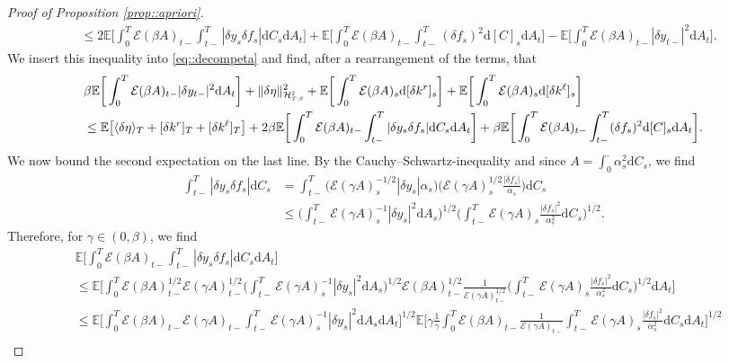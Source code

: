 \documentclass[10pt]{article} %
\newcommand\cE{\mathcal E}
\newcommand\cH{\mathcal H}
\newcommand{\smalltext}[1]{\text{\fontsize{4}{4}\selectfont$#1$}}
\def \E{\mathbb{E}}
\newcommand{\1}{\mathbf{1}}
\def\d{\mathrm{d}}
\begin{document}
\begin{proof}[Proof of Proposition \ref{prop::apriori}]
\begin{align*}
	&\leq 2 \E\bigg[ \int_0^T \cE(\beta A)_{t-} \int_{t-}^T |\delta y_s \delta f_s| \d C_s\d A_t \bigg] + \E\bigg[ \int_0^T \cE(\beta A)_{t-} \int_{t-}^T (\delta f_s)^2 \d [C]_s \d A_t \bigg]  - \E\bigg[ \int_0^T \cE(\beta A)_{t-}|\delta y_{t-}|^2 \d A_t \bigg].
\end{align*}
We insert this inequality into \eqref{eq::decompeta} and find, after a rearrangement of the terms, that
\begin{align}\label{eq::inequality_norms_1}
	&\beta \E\bigg[ \int_0^T \cE(\beta A)_{t-}|\delta y_{t-}|^2 \d A_t \bigg] + \|\delta\eta\|^2_{\cH^\smalltext{2}_{\smalltext{T}\smalltext{,}\smalltext{\beta}}} + \E\bigg[\int_0^T \cE(\beta A)_s \d [\delta k^r]_s\bigg] + \E\bigg[\int_0^T \cE(\beta A)_s \d [\delta k^\ell]_s\bigg] \nonumber\\
	&\leq \E\big[ \langle \delta\eta \rangle_T + [\delta k^r]_T + [\delta k^\ell]_T \big] + 2\beta \E\bigg[ \int_0^T \cE(\beta A)_{t-} \int_{t-}^T |\delta y_s \delta f_s| \d C_s\d A_t \bigg] + \beta \E\bigg[ \int_0^T \cE(\beta A)_{t-} \int_{t-}^T (\delta f_s)^2 \d [C]_s \d A_t \bigg].
\end{align}
We now bound the second expectation on the last line. By the Cauchy--Schwartz-inequality and since $A = \int_0^\cdot \alpha^2_s \d C_s$, we find
\begin{align*}
	\int_{t-}^T |\delta y_s \delta f_s|\d C_s 
	&= \int_{t-}^T \big(\cE(\gamma A)^{-1/2}_s|\delta y_s|\alpha_s\big) \bigg(\cE(\gamma A)^{1/2}_s\frac{|\delta f_s|}{\alpha_s}\bigg)\d C_s \\
	&\leq \bigg(\int_{t-}^T \cE(\gamma A)^{-1}_s |\delta y_s|^2 \d A_s\bigg)^{1/2}\bigg(\int_{t-}^T \cE(\gamma A)_s\frac{|\delta f_s|^2}{\alpha^2_s}\d C_s\bigg)^{1/2}.
\end{align*}
Therefore, for $\gamma \in (0,\beta)$, we find
\begin{align}\label{eq6}
	&\E\bigg[ \int_0^T \cE(\beta A)_{t-}\int_{t-}^T |\delta y_s \delta f_s|\d C_s \d A_t \bigg] \nonumber \\
	&\leq \E\bigg[ \int_0^T \cE(\beta A)^{1/2}_{t-}\cE(\gamma A)^{1/2}_{t-}\bigg(\int_{t-}^T \cE(\gamma A)^{-1}_s |\delta y_s|^2 \d A_s\bigg)^{1/2} \cE(\beta A)^{1/2}_{t-}\frac{1}{\cE(\gamma A)^{1/2}_{t-}}\bigg(\int_{t-}^T \cE(\gamma A)_s\frac{|\delta f_s|^2}{\alpha^2_s}\d C_s\bigg)^{1/2} \d A_t \bigg] \nonumber \\
	& \leq \E\bigg[ \int_0^T \cE(\beta A)_{t-}\cE(\gamma A)_{t-}\int_{t-}^T \cE(\gamma A)^{-1}_s |\delta y_s|^2 \d A_s \d A_t \bigg]^{1/2} \E\bigg[ \gamma \frac{1}{\gamma} \int_0^T\cE(\beta A)_{t-}\frac{1}{\cE(\gamma A)_{t-}}\int_{t-}^T \cE(\gamma A)_s\frac{|\delta f_s|^2}{\alpha^2_s}\d C_s \d A_t \bigg]^{1/2} \nonumber\\

\end{align}
\end{proof}
\end{document}
